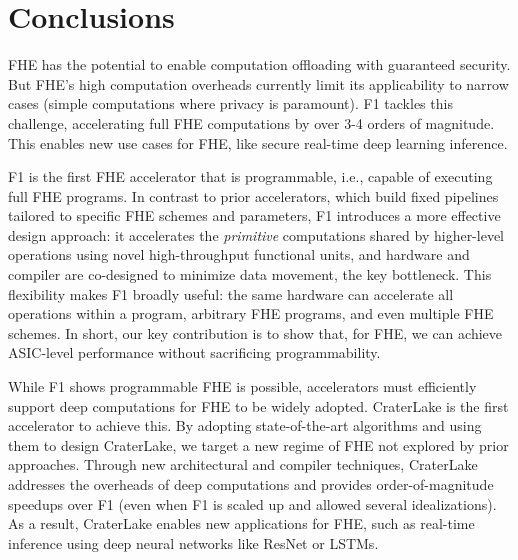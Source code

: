 \chapter{Conclusions}\label{sec:conclusion}

FHE has the potential to enable computation offloading with guaranteed
security. But FHE's high computation overheads currently limit its
applicability to narrow cases (simple computations where privacy is paramount).
F1 tackles this challenge, accelerating full FHE computations by over 3-4
orders of magnitude. This enables new use cases for FHE, like secure real-time
deep learning inference.

F1 is the first FHE accelerator that is programmable, i.e., capable of
executing full FHE programs. In contrast to prior accelerators, which build
fixed pipelines tailored to specific FHE schemes and parameters, F1 introduces
a more effective design approach: it accelerates the \emph{primitive}
computations shared by higher-level operations using novel high\hyp{}throughput
functional units, and hardware and compiler are co-designed to minimize data
movement, the key bottleneck. This flexibility makes F1 broadly useful: the
same hardware can accelerate all operations within a program, arbitrary FHE
programs, and even multiple FHE schemes. In short, our key contribution is to
show that, for FHE, we can achieve ASIC-level performance without sacrificing
programmability.

While F1 shows programmable FHE is possible, accelerators must efficiently
support deep computations for FHE to be widely adopted. CraterLake is the first
accelerator to achieve this. By adopting state-of-the-art algorithms and using
them to design CraterLake, we target a new regime of FHE not explored by prior
approaches. Through new architectural and compiler techniques, CraterLake
addresses the overheads of deep computations and provides order-of-magnitude
speedups over F1 (even when F1 is scaled up and allowed several idealizations).
As a result, CraterLake enables new applications for FHE, such as real-time
inference using deep neural networks like ResNet or LSTMs.
